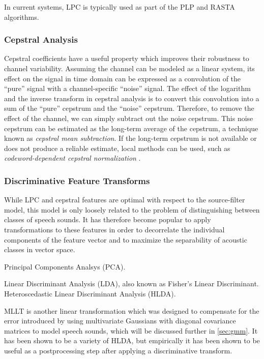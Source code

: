 \documentclass{article}
\begin{document}
In current systems, LPC is typically used as part of the PLP
\cite{hermansky1990} and RASTA \cite{hermansky1994} algorithms.

\subsubsection{Cepstral Analysis}
\label{sec:ceps}

Cepstral coefficients have a useful property which improves their
robustness to channel variability.  Assuming the channel can be
modeled as a linear system, its effect on the signal in time domain
can be expressed as a convolution of the ``pure'' signal with a
channel-specific ``noise'' signal.  The effect of the logarithm and
the inverse transform in cepstral analysis is to convert this
convolution into a sum of the ``pure'' cepstrum and the ``noise''
cepstrum.  Therefore, to remove the effect of the channel, we can
simply subtract out the noise cepstrum.  This noise cepstrum can be
estimated as the long-term average of the cepstrum, a technique known
as {\em cepstral mean subtraction}.  If the long-term cepstrum is not
available or does not produce a reliable estimate, local methods can
be used, such as {\em codeword-dependent cepstral normalization}
\cite{acero1990}.

\subsubsection{Discriminative Feature Transforms}
\label{sec:lda}

While LPC and cepstral features are optimal with respect to the
source-filter model, this model is only loosely related to the problem
of distinguishing between classes of speech sounds.  It has therefore
become popular to apply transformations to these features in order to
decorrelate the individual components of the feature vector and to
maximize the separability of acoustic classes in vector space.

Principal Components Analsys (PCA).

Linear Discriminant Analysis (LDA), also known as Fisher's Linear
Discriminant.  Heteroscedastic Linear Discriminant Analysis (HLDA).

MLLT \cite{gopinath1998} is another linear transformation which was
designed to compensate for the error introduced by using multivariate
Gaussians with diagonal covariance matrices to model speech sounds,
which will be discussed further in \ref{sec:gmm}.  It has been shown
to be a variety of HLDA, but empirically it has been shown to be
useful as a postprocessing step after applying a discriminative
transform.
\end{document}
